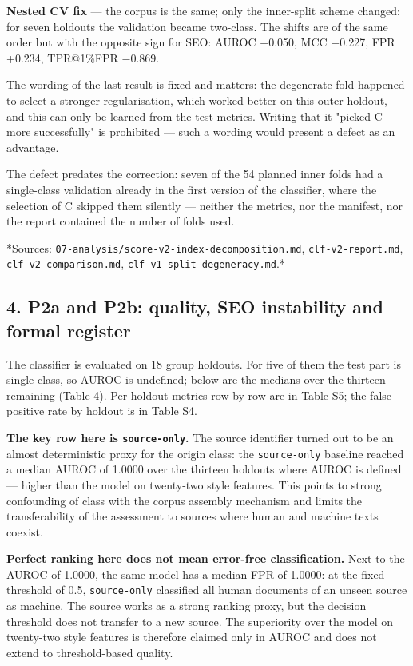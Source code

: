 \documentclass[11pt,a4paper]{article}
\renewcommand{\_}{\textunderscore\allowbreak}
\begin{document}
\textbf{Nested CV fix} — the corpus is the same; only the inner-split scheme
changed: for seven holdouts the validation became two-class. The shifts are of
the same order but with the opposite sign for SEO: AUROC $-$0.050, MCC $-$0.227,
FPR +0.234, TPR@1\%FPR $-$0.869.

The wording of the last result is fixed and matters: the degenerate fold
happened to select a stronger regularisation, which worked better on this
outer holdout, and this can only be learned from the test metrics. Writing
that it "picked C more successfully" is prohibited — such a wording would
present a defect as an advantage.

The defect predates the correction: seven of the 54 planned inner folds had a
single-class validation already in the first version of the classifier, where
the selection of C skipped them silently — neither the metrics, nor the
manifest, nor the report contained the number of folds used.

*Sources: \texttt{07-\allowbreak{}analysis/score-\allowbreak{}v2-\allowbreak{}index-\allowbreak{}decomposition.md}, \texttt{clf-\allowbreak{}v2-\allowbreak{}report.md},
\texttt{clf-\allowbreak{}v2-\allowbreak{}comparison.md}, \texttt{clf-\allowbreak{}v1-\allowbreak{}split-\allowbreak{}degeneracy.md}.*

\subsection{4. P2a and P2b: quality, SEO instability and formal register}

The classifier is evaluated on 18 group holdouts. For five of them the test
part is single-class, so AUROC is undefined; below are the medians over the
thirteen remaining (Table 4). Per-holdout metrics row by row are in Table S5;
the false positive rate by holdout is in Table S4.

\textbf{The key row here is \texttt{source-\allowbreak{}only}.} The source identifier turned out to be
an almost deterministic proxy for the origin class: the \texttt{source-\allowbreak{}only} baseline
reached a median AUROC of 1.0000 over the thirteen holdouts where AUROC is defined — higher than the
model on twenty-two style features. This points to strong confounding of class
with the corpus assembly mechanism and limits the transferability of the
assessment to sources where human and machine texts coexist.

\textbf{Perfect ranking here does not mean error-free classification.} Next to the
AUROC of 1.0000, the same model has a median FPR of 1.0000: at the fixed
threshold of 0.5, \texttt{source-\allowbreak{}only} classified all human documents of an unseen
source as machine. The source works as a strong ranking proxy, but the
decision threshold does not transfer to a new source. The superiority over the
model on twenty-two style features is therefore claimed only in AUROC and does
not extend to threshold-based quality.
\end{document}
